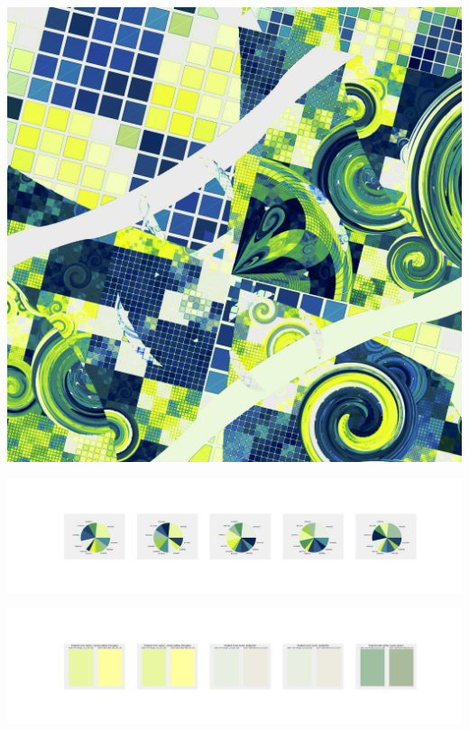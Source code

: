 \documentclass[11pt]{article}
\begin{document}
\begin{landscape}
    \begin{center}
    \includegraphics[width=\textwidth]{./nbimg/file (293).jpg}
    \end{center}

    \begin{center}
    \includegraphics[width=250mm]{./nbimg/pie-215.jpg}
    \end{center}

    \begin{center}
    \includegraphics[width=250mm]{./nbimg/peak-215.jpg}
    \end{center}
    


\end{landscape}
\end{document}
